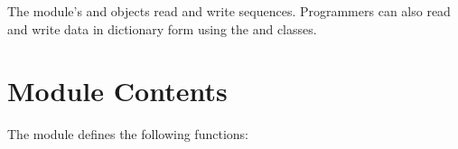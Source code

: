 \documentclass[letterpaper,10pt,english]{sphinxmanual}
\begin{document}
The {\hyperref[\detokenize{csv:module-csv}]{}} module’s {\hyperref[\detokenize{csv:csv.reader}]{}} and {\hyperref[\detokenize{csv:csv.writer}]{}} objects read and
write sequences.  Programmers can also read and write data in dictionary form
using the {\hyperref[\detokenize{csv:csv.DictReader}]{}} and {\hyperref[\detokenize{csv:csv.DictWriter}]{}} classes.


\section{Module Contents}
\label{\detokenize{csv:module-contents}}\label{\detokenize{csv:csv-contents}}
The {\hyperref[\detokenize{csv:module-csv}]{}} module defines the following functions:

\ignorespaces {}

\vspace{5px}
\end{document}
